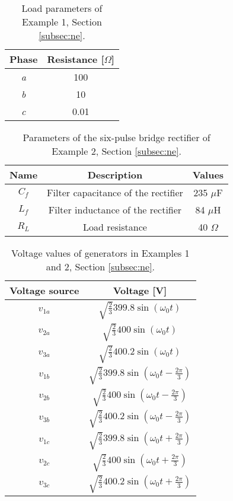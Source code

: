 \documentclass[a4paper]{article}
\theoremstyle{plain}
\begin{document}
	\begin{table}[!h]
			\centering
			\begin{tabular}{cc}
				\toprule
                          Phase & Resistance [$\Omega$] \\
				\midrule
				\textit{a} & 100 \\
				\textit{b} & 10 \\
				\textit{c} & 0.01 \\
				\bottomrule
			\end{tabular}
			\caption{Load parameters of Example 1, Section \ref{subsec:ne}.}
			\label{Appendix:3FTable:Loads}
		\end{table}

	\begin{table}
			\centering
			\begin{tabular}{ccc}
				\toprule
				Name & Description & Values \\ \midrule
				$C_f$ & Filter capacitance of the rectifier & 235 $\mu$F\\
				$L_f$ & Filter inductance of the rectifier & 84 $\mu$H \\
				$R_L$ & Load resistance					& 	40 $\Omega$\\
				\bottomrule
			\end{tabular}
			\caption{Parameters of the six-pulse bridge
                          rectifier of Example 2, Section \ref{subsec:ne}.}
			\label{Appendix:TableNonlinearload}
		\end{table}
		
	\begin{table}
		\centering
		\renewcommand{\arraystretch}{2.0}
		\begin{tabular}{cc}
			\toprule
			Voltage source & Voltage [V] \\ \midrule
			$v_{1a}$ & $\sqrt{\frac{2}{3}}399.8 \sin{\left(\omega_0 t\right)}$ \\
			$v_{2a}$ & $\sqrt{\frac{2}{3}}400 \sin{\left(\omega_0 t\right)}$\\
			$v_{3a}$ & $\sqrt{\frac{2}{3}} 400.2 \sin{\left(\omega_0 t\right)}$\\
			$v_{1b}$ & $\sqrt{\frac{2}{3}}399.8 \sin{\left(\omega_0 t-\frac{2\pi}{3}\right)}$\\
			$v_{2b}$ & $\sqrt{\frac{2}{3}}400 \sin{\left(\omega_0 t-\frac{2\pi}{3}\right)}$\\
			$v_{3b}$ & $\sqrt{\frac{2}{3}} 400.2 \sin{\left(\omega_0 t-\frac{2\pi}{3}\right)}$\\
			$v_{1c}$ & $\sqrt{\frac{2}{3}}399.8 \sin{\left(\omega_0 t+\frac{2\pi}{3}\right)}$\\
			$v_{2c}$ & $\sqrt{\frac{2}{3}} 400 \sin{\left(\omega_0 t+\frac{2\pi}{3}\right)}$\\
			$v_{3c}$ & $\sqrt{\frac{2}{3}} 400.2 \sin{\left(\omega_0 t+\frac{2\pi}{3}\right)}$\\
			\bottomrule
		\end{tabular}
		\caption{Voltage values of generators in Examples 1 and 2, Section \ref{subsec:ne}.}
		\label{Appendix:TableVoltages}
	\end{table}      \clearpage
\end{document}
